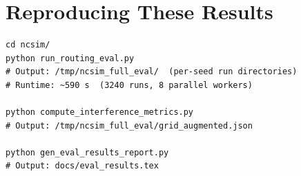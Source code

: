 \documentclass[11pt]{article}
\begin{document}
\section{Reproducing These Results}

\begin{verbatim}
cd ncsim/
python run_routing_eval.py
# Output: /tmp/ncsim_full_eval/  (per-seed run directories)
# Runtime: ~590 s  (3240 runs, 8 parallel workers)

python compute_interference_metrics.py
# Output: /tmp/ncsim_full_eval/grid_augmented.json

python gen_eval_results_report.py
# Output: docs/eval_results.tex
\end{verbatim}
\end{document}
